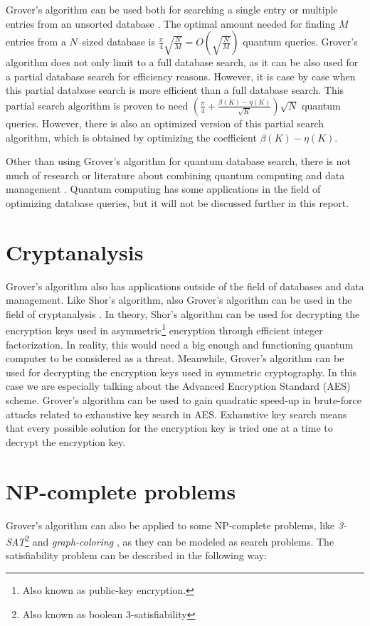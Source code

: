 \documentclass[english,oneside,openright]{UH_DS_report}
\begin{document}
Grover's algorithm can be used both for searching a single entry or multiple entries from an unsorted database \cite{giri2017review}. The optimal amount needed for finding $M$ entries from a $N$--sized database is $\frac{\pi}{4}\sqrt{\frac{N}{M}} = O(\sqrt{\frac{N}{M}})$ quantum queries. Grover's algorithm does not only limit to a full database search, as it can be also used for a partial database search for efficiency reasons. However, it is case by case when this partial database search is more efficient than a full database search. This partial search algorithm is proven to need $(\frac{\pi}{4}+\frac{\beta (K) - \eta (K)}{\sqrt{K}})\sqrt{N}$ quantum queries. However, there is also an optimized version of this partial search algorithm, which is obtained by optimizing the coefficient $\beta (K) - \eta (K)$.

Other than using Grover's algorithm for quantum database search, there is not much of research or literature about combining quantum computing and data management \cite{qcdb}. Quantum computing has some applications in the field of optimizing database queries, but it will not be discussed further in this report.

\section{Cryptanalysis}

Grover's algorithm also has applications outside of the field of databases and data management. Like Shor's algorithm, also Grover's algorithm can be used in the field of cryptanalysis \cite{grassl2016applying}. In theory, Shor's algorithm can be used for decrypting the encryption keys used in asymmetric\footnote{Also known as public-key encryption.} encryption through efficient integer factorization. In reality, this would need a big enough and functioning quantum computer to be considered as a threat. Meanwhile, Grover's algorithm can be used for decrypting the encryption keys used in symmetric cryptography. In this case we are especially talking about the Advanced Encryption Standard (AES) scheme. Grover's algorithm can be used to gain quadratic speed-up in brute-force attacks related to exhaustive key search in AES. Exhaustive key search means that every possible solution for the encryption key is tried one at a time to decrypt the encryption key.

\section{NP-complete problems}
Grover's algorithm can also be applied to some NP-complete problems, like \emph{3-SAT}\footnote{Also known as boolean 3-satisfiability} \cite{ambainis2004quantum} and \emph{graph-coloring} \cite{introtoqc}, as they can be modeled as search problems. The satisfiability problem can be described in the following way:
\end{document}
